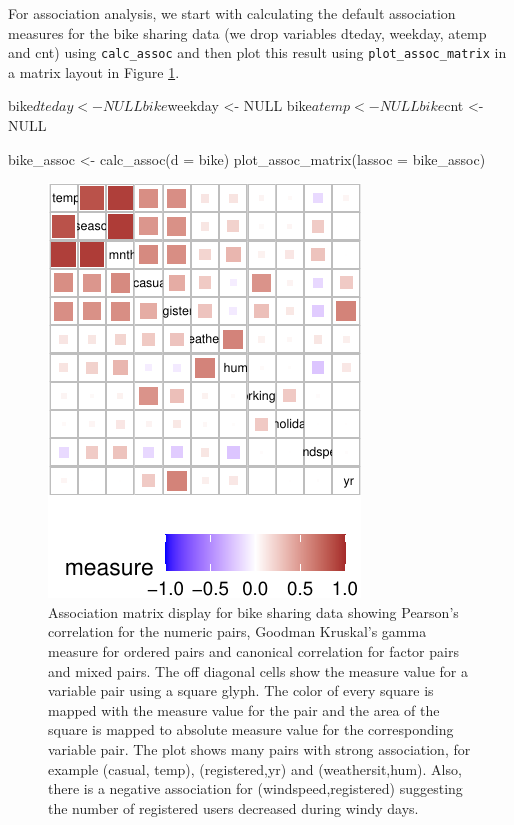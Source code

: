 For association analysis, we start with calculating the default
association measures for the bike sharing data (we drop variables
dteday, weekday, atemp and cnt) using \texttt{calc\_assoc} and then plot
this result using \texttt{plot\_assoc\_matrix} in a matrix layout in
Figure \ref{fig:assoc-matrix-bike}.

\begin{Schunk}
\begin{Sinput}
bike$dteday <- NULL 
bike$weekday <- NULL
bike$atemp <- NULL
bike$cnt <- NULL

bike_assoc <- calc_assoc(d = bike)
plot_assoc_matrix(lassoc = bike_assoc)
\end{Sinput}
\begin{figure}

{\centering \includegraphics{rj_paper_files/figure-latex/assoc-matrix-bike-1} 

}

\caption[Association matrix display for bike sharing data showing Pearson's correlation for the numeric pairs, Goodman Kruskal's gamma measure for ordered pairs and canonical correlation for factor pairs and mixed pairs]{Association matrix display for bike sharing data showing Pearson's correlation for the numeric pairs, Goodman Kruskal's gamma measure for ordered pairs and canonical correlation for factor pairs and mixed pairs. The off diagonal cells show the measure value for a variable pair using a square glyph. The color of every square is mapped with the measure value for the pair and the area of the square is mapped to absolute measure value for the corresponding variable pair. The plot shows many pairs with strong association, for example (casual, temp), (registered,yr) and (weathersit,hum). Also, there is a negative association for (windspeed,registered) suggesting the number of registered users decreased during windy days.}\label{fig:assoc-matrix-bike}
\end{figure}
\end{Schunk}

